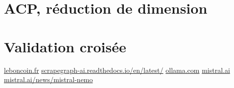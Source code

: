 \documentclass[a4paper, 12pt, twoside]{report}
\begin{document}
\section{ACP, réduction de dimension}

\section{Validation croisée}

\renewcommand{\bibname}{Webographie}
\begin{thebibliography}{2}
    \url{leboncoin.fr}
    \url{scrapegraph-ai.readthedocs.io/en/latest/}
    \url{ollama.com}
    \url{mistral.ai}
    \url{mistral.ai/news/mistral-nemo}
\end{thebibliography}
\end{document}
